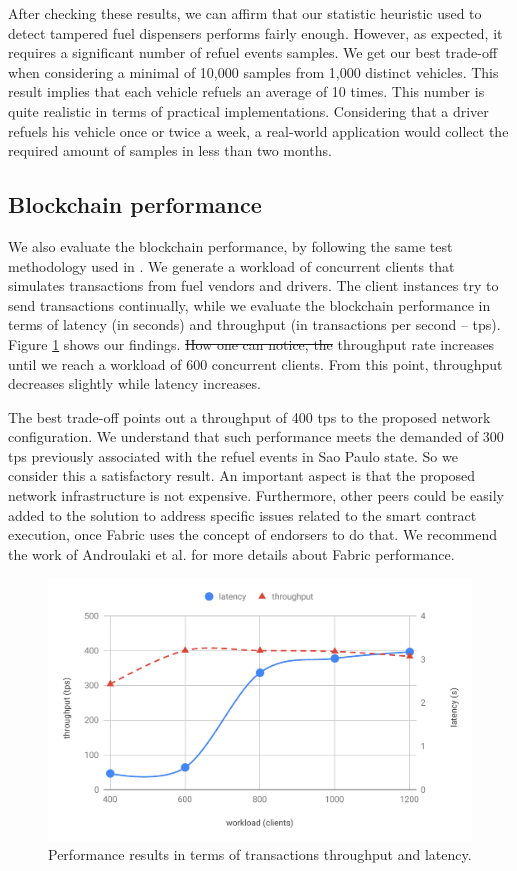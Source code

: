 \documentclass[sigplan]{acmart}
\providecommand{\DIFadd}[1]{{\protect\color{blue}\uwave{#1}}} %
\providecommand{\DIFdel}[1]{{\protect\color{red}\sout{#1}}}                      %
\providecommand{\DIFaddbegin}{} %
\providecommand{\DIFaddend}{} %
\providecommand{\DIFdelbegin}{} %
\providecommand{\DIFdelend}{} %
\begin{document}
After checking these results, we can affirm that our statistic heuristic used to detect tampered fuel dispensers performs fairly enough.
However, as expected, it requires a significant number of refuel events samples.
We get our best trade-off when considering a minimal of 10,000 samples from 1,000 distinct vehicles.
This result implies that each vehicle refuels an average of 10 times.
This number is quite realistic in terms of practical implementations.
Considering that a driver refuels his vehicle once or twice a week, a real-world application would collect the required amount of samples in less than two months.

\subsection{Blockchain performance}
We also evaluate the blockchain performance, by following the same test methodology used in \cite{MeloJr.2019}.
We generate a workload of concurrent clients that simulates transactions from fuel vendors and drivers.
The client instances try to send transactions continually, while we evaluate the blockchain performance in terms of latency (in seconds) and throughput (in transactions per second -- tps).
Figure \ref{f:performance} shows our findings.
\DIFdelbegin \DIFdel{How one can notice, the }\DIFdelend \DIFaddbegin \DIFadd{The }\DIFaddend throughput rate increases until we reach a workload of 600 concurrent clients.
From this point, throughput decreases slightly while latency increases.

The best trade-off points out a throughput of 400 tps to the proposed network configuration.
We understand that such performance meets the demanded of 300 tps previously associated with the refuel events in Sao Paulo state.
So we consider this a satisfactory result.
An important aspect is that the proposed network infrastructure is not expensive.
Furthermore, other peers could be easily added to the solution to address specific issues related to the smart contract execution, once Fabric uses the concept of endorsers to do that.
We recommend the work of Androulaki et al. \cite{Androulaki2018} for more details about Fabric performance.

\begin{figure}[!t]
\centering
\includegraphics[width=.4\textwidth]{performance}
\caption{Performance results in terms of transactions throughput and latency.}
\label{f:performance}
\end{figure}
\end{document}
